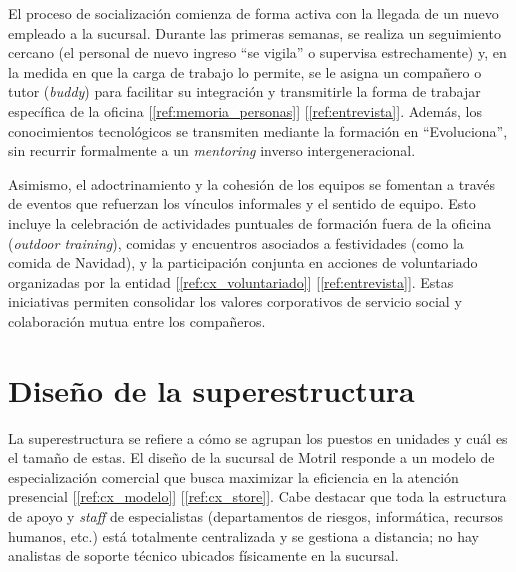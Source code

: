 El proceso de socialización comienza de forma activa con la llegada de un nuevo empleado a la sucursal. Durante las primeras semanas, se realiza un seguimiento cercano (el personal de nuevo ingreso ``se vigila'' o supervisa estrechamente) y, en la medida en que la carga de trabajo lo permite, se le asigna un compañero o tutor (\textit{buddy}) para facilitar su integración y transmitirle la forma de trabajar específica de la oficina [\ref{ref:memoria_personas}] [\ref{ref:entrevista}]. Además, los conocimientos tecnológicos se transmiten mediante la formación en ``Evoluciona'', sin recurrir formalmente a un \textit{mentoring} inverso intergeneracional.

Asimismo, el adoctrinamiento y la cohesión de los equipos se fomentan a través de eventos que refuerzan los vínculos informales y el sentido de equipo. Esto incluye la celebración de actividades puntuales de formación fuera de la oficina (\textit{outdoor training}), comidas y encuentros asociados a festividades (como la comida de Navidad), y la participación conjunta en acciones de voluntariado organizadas por la entidad [\ref{ref:cx_voluntariado}] [\ref{ref:entrevista}]. Estas iniciativas permiten consolidar los valores corporativos de servicio social y colaboración mutua entre los compañeros.

\section{Diseño de la superestructura}

%
%
%

La superestructura se refiere a cómo se agrupan los puestos en unidades y cuál es el tamaño de estas. El diseño de la sucursal de Motril responde a un modelo de especialización comercial que busca maximizar la eficiencia en la atención presencial [\ref{ref:cx_modelo}] [\ref{ref:cx_store}]. Cabe destacar que toda la estructura de apoyo y \textit{staff} de especialistas (departamentos de riesgos, informática, recursos humanos, etc.) está totalmente centralizada y se gestiona a distancia; no hay analistas de soporte técnico ubicados físicamente en la sucursal.

